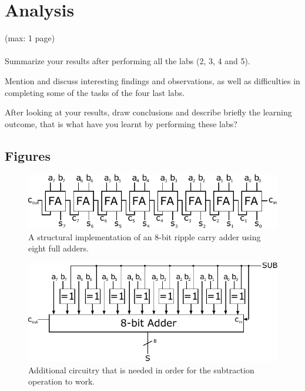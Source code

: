 \documentclass[a4,11pt]{article}
\begin{document}
\section{Analysis}
(max: 1 page)
\\\\
Summarize your results after performing all the labs (2, 3, 4 and 5).

Mention and discuss interesting findings and observations, as well as difficulties in completing some of the tasks of the four last labs.

After looking at your results, draw conclusions and describe briefly the learning outcome, that is what have you learnt by performing these labs?  

\newpage
\begin{appendix}

\section{Figures}
\label{app:fig}

\begin{figure}[h!]
 	\centering
	\includegraphics[width=1\columnwidth]{Figurer/rca}
  	\caption{A structural implementation of an 8-bit ripple carry adder using eight full adders.}
  	\label{fig:rca}
\end{figure}

\begin{figure}[h!]
 	\centering
	\includegraphics[width=1\columnwidth]{Figurer/sub}
  	\caption{Additional circuitry that is needed in order for the subtraction
		operation to work.}
  	\label{fig:sub}
\end{figure}

\end{appendix}
\end{document}
